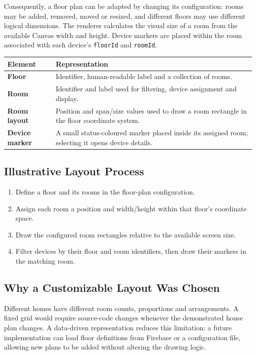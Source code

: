 \documentclass[11pt,a4paper]{article}
\begin{document}
Consequently, a floor plan can be adapted by changing its configuration: rooms may be added, removed, moved or resized, and different floors may use different logical dimensions. The renderer calculates the visual size of a room from the available Canvas width and height. Device markers are placed within the room associated with each device's \texttt{floorId} and \texttt{roomId}.

\begin{tabularx}{\textwidth}{>{\bfseries}p{3.3cm}X}
\toprule
Element & Representation \\
\midrule
Floor & Identifier, human-readable label and a collection of rooms. \\
Room & Identifier and label used for filtering, device assignment and display. \\
Room layout & Position and span/size values used to draw a room rectangle in the floor coordinate system. \\
Device marker & A small status-coloured marker placed inside its assigned room; selecting it opens device details. \\
\bottomrule
\end{tabularx}

\subsection{Illustrative Layout Process}
\begin{enumerate}[leftmargin=1.5em,itemsep=3pt]
\item Define a floor and its rooms in the floor-plan configuration.
\item Assign each room a position and width/height within that floor's coordinate space.
\item Draw the configured room rectangles relative to the available screen size.
\item Filter devices by their floor and room identifiers, then draw their markers in the matching room.
\end{enumerate}

\subsection{Why a Customizable Layout Was Chosen}
Different homes have different room counts, proportions and arrangements. A fixed grid would require source-code changes whenever the demonstrated house plan changes. A data-driven representation reduces this limitation: a future implementation can load floor definitions from Firebase or a configuration file, allowing new plans to be added without altering the drawing logic.
\end{document}
